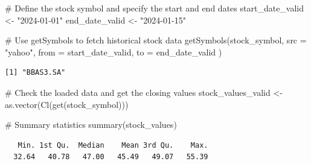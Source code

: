 \documentclass[
  letterpaper,
  DIV=11,
  numbers=noendperiod]{scrreprt}
\newenvironment{Shaded}{\begin{snugshade}}{\end{snugshade}}
\newcommand{\AttributeTok}[1]{\textcolor[rgb]{0.40,0.45,0.13}{#1}}
\newcommand{\CommentTok}[1]{\textcolor[rgb]{0.37,0.37,0.37}{#1}}
\newcommand{\FunctionTok}[1]{\textcolor[rgb]{0.28,0.35,0.67}{#1}}
\newcommand{\NormalTok}[1]{\textcolor[rgb]{0.00,0.23,0.31}{#1}}
\newcommand{\OtherTok}[1]{\textcolor[rgb]{0.00,0.23,0.31}{#1}}
\newcommand{\StringTok}[1]{\textcolor[rgb]{0.13,0.47,0.30}{#1}}
\begin{document}
\begin{Shaded}
\begin{Highlighting}[]
\CommentTok{\# Define the stock symbol and specify the start and end dates}
\NormalTok{start\_date\_valid }\OtherTok{\textless{}{-}} \StringTok{"2024{-}01{-}01"}
\NormalTok{end\_date\_valid }\OtherTok{\textless{}{-}} \StringTok{"2024{-}01{-}15"}

\CommentTok{\# Use getSymbols to fetch historical stock data}
\FunctionTok{getSymbols}\NormalTok{(stock\_symbol,}
    \AttributeTok{src =} \StringTok{"yahoo"}\NormalTok{,}
    \AttributeTok{from =}\NormalTok{ start\_date\_valid,}
    \AttributeTok{to =}\NormalTok{ end\_date\_valid}
\NormalTok{)}
\end{Highlighting}
\end{Shaded}

\begin{verbatim}
[1] "BBAS3.SA"
\end{verbatim}

\begin{Shaded}
\begin{Highlighting}[]
\CommentTok{\# Check the loaded data and get the closing values}
\NormalTok{stock\_values\_valid }\OtherTok{\textless{}{-}} \FunctionTok{as.vector}\NormalTok{(}\FunctionTok{Cl}\NormalTok{(}\FunctionTok{get}\NormalTok{(stock\_symbol)))}

\CommentTok{\# Summary statistics}
\FunctionTok{summary}\NormalTok{(stock\_values)}
\end{Highlighting}
\end{Shaded}

\begin{verbatim}
   Min. 1st Qu.  Median    Mean 3rd Qu.    Max. 
  32.64   40.78   47.00   45.49   49.07   55.39 
\end{verbatim}
\end{document}
